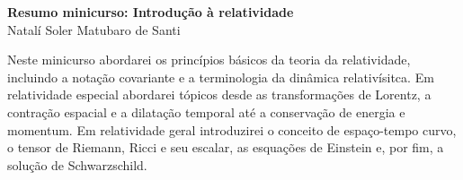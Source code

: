 \documentclass[11pt,a4paper,titlepage,brazil]{article}
\begin{document}
\begin{center}
 \large{\textbf{Resumo minicurso: Introdução à relatividade}}\\
 Natalí Soler Matubaro de Santi
\end{center}

Neste minicurso abordarei os princípios básicos da teoria da relatividade, incluindo a notação covariante e a terminologia da dinâmica relativísitca. Em relatividade especial abordarei tópicos desde as transformações de Lorentz, a contração espacial e a dilatação temporal até a conservação de energia e momentum. Em relatividade geral introduzirei o conceito de espaço-tempo curvo, o tensor de Riemann, Ricci e seu escalar, as esquações de Einstein e, por fim, a solução de Schwarzschild.
\end{document}
